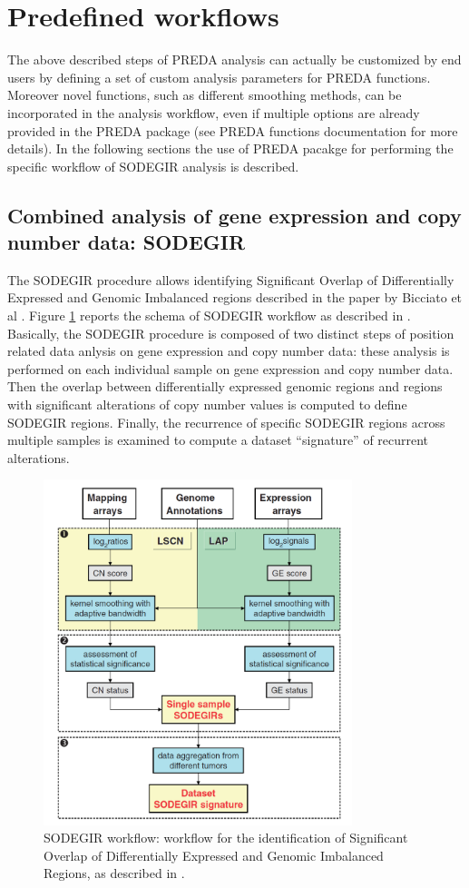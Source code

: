 \documentclass[a4paper,10pt]{article}
\begin{document}
\section{Predefined workflows}
The above described steps of PREDA analysis can actually be customized by end users by defining a set of custom analysis parameters for PREDA functions. Moreover novel functions, such as different smoothing methods, can be incorporated in the analysis workflow, even if multiple options are already provided in the PREDA package (see PREDA functions documentation for more details). In the following sections the use of PREDA pacakge for performing the specific workflow of SODEGIR analysis is described.


\subsection{Combined analysis of gene expression and copy number data: SODEGIR}
The SODEGIR procedure allows identifying Significant Overlap of Differentially Expressed and Genomic Imbalanced regions described in the paper by Bicciato et al \cite{PubMed_19542187}. Figure \ref{fig:sodegirWorkflow} reports the schema of SODEGIR workflow as described in \cite{PubMed_19542187}. Basically, the SODEGIR procedure is composed of two distinct steps of position related data anlysis on gene expression and copy number data: these analysis is performed on each individual sample on gene expression and copy number data. Then the overlap between differentially expressed genomic regions and regions with significant alterations of copy number values is computed to define SODEGIR regions. Finally, the recurrence of specific SODEGIR regions across multiple samples is examined to compute a dataset ``signature'' of recurrent alterations.

\begin{figure}[htbp]
 \centering
 \includegraphics[width=9cm]{images/sodegirWorkflow.png}
  \caption{SODEGIR workflow: workflow for the identification of Significant Overlap of Differentially Expressed and Genomic Imbalanced Regions, as described in \cite{PubMed_19542187}.}
 \label{fig:sodegirWorkflow}
\end{figure}
\end{document}
